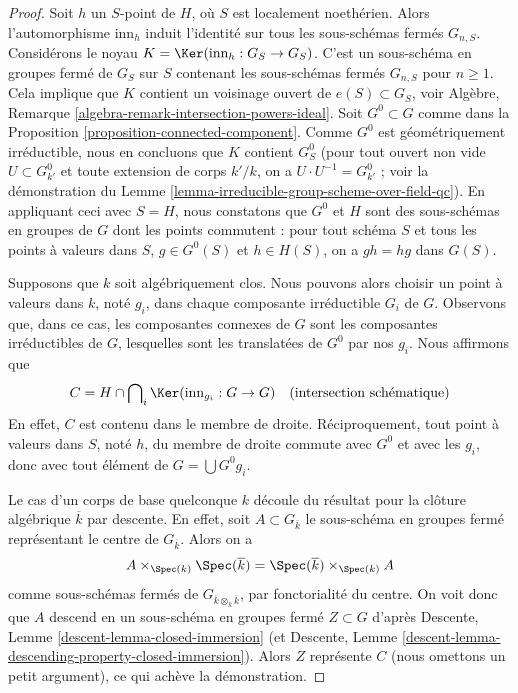 \begin{proof}
\medskip\noindent
Soit $h$ un $S$-point de $H$, où $S$ est localement noethérien.
Alors l'automorphisme $\text{inn}_h$ induit l'identité sur tous
les sous-schémas fermés $G_{n, S}$. Considérons le noyau
$K = \Ker(\text{inn}_h : G_S \to G_S)$.
C'est un sous-schéma en groupes fermé de $G_S$ sur $S$ contenant les
sous-schémas fermés $G_{n, S}$ pour $n \geq 1$.
Cela implique que $K$ contient un voisinage ouvert de
$e(S) \subset G_S$, voir
Algèbre, Remarque \ref{algebra-remark-intersection-powers-ideal}.
Soit $G^0 \subset G$ comme dans la Proposition \ref{proposition-connected-component}.
Comme $G^0$ est géométriquement irréductible, nous en concluons que $K$ contient
$G^0_S$ (pour tout ouvert non vide $U \subset G^0_{k'}$ et toute extension de corps
$k'/k$, on a $U \cdot U^{-1} = G^0_{k'}$ ; voir la démonstration du
Lemme \ref{lemma-irreducible-group-scheme-over-field-qc}).
En appliquant ceci avec $S = H$, nous constatons que $G^0$ et $H$
sont des sous-schémas en groupes de $G$ dont les points commutent : pour tout schéma $S$
et tous les points à valeurs dans $S$, $g \in G^0(S)$ et $h \in H(S)$, on a
$gh = hg$ dans $G(S)$.

\medskip\noindent
Supposons que $k$ soit algébriquement clos. Nous pouvons alors choisir un point à valeurs dans $k$,
noté $g_i$, dans chaque composante irréductible $G_i$ de $G$. Observons que,
dans ce cas, les composantes connexes de $G$ sont les composantes irréductibles
de $G$, lesquelles sont les translatées de $G^0$ par nos $g_i$. Nous affirmons que
$$
C = H \cap \bigcap\nolimits_i \Ker(\text{inn}_{g_i} : G \to G)
\quad (\text{intersection schématique})
$$
En effet, $C$ est contenu dans le membre de droite. Réciproquement, tout
point à valeurs dans $S$, noté $h$, du membre de droite commute avec $G^0$
et avec les $g_i$, donc avec tout élément de $G = \bigcup G^0g_i$.

\medskip\noindent
Le cas d'un corps de base quelconque $k$ découle du résultat pour la
clôture algébrique $\overline{k}$ par descente. En effet, soit
$A \subset G_{\overline{k}}$ le sous-schéma en groupes fermé représentant
le centre de $G_{\overline{k}}$. Alors on a
$$
A \times_{\Spec(k)} \Spec(\overline{k}) =
\Spec(\overline{k}) \times_{\Spec(k)} A
$$
comme sous-schémas fermés de $G_{\overline{k} \otimes_k \overline{k}}$, par
fonctorialité du centre. On voit donc que $A$ descend
en un sous-schéma en groupes fermé $Z \subset G$ d'après
Descente, Lemme \ref{descent-lemma-closed-immersion}
(et Descente, Lemme \ref{descent-lemma-descending-property-closed-immersion}).
Alors $Z$ représente $C$ (nous omettons un petit argument), ce qui achève la démonstration.
\end{proof}







